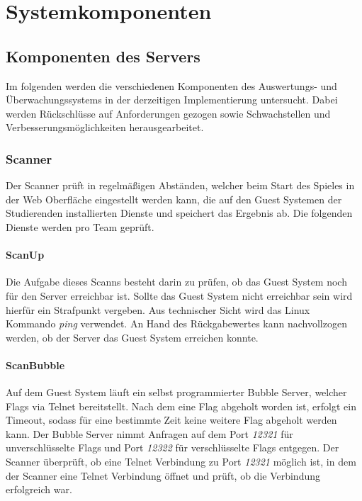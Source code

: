 \section{Systemkomponenten}\label{sec:Systemkomponenten}

\subsection{Komponenten des Servers}\label{subsec:Komponente_des_Servers}
Im folgenden werden die verschiedenen Komponenten des Auswertungs- und Überwachungssystems in der derzeitigen Implementierung untersucht. Dabei werden Rückschlüsse auf Anforderungen gezogen sowie Schwachstellen und Verbesserungsmöglichkeiten herausgearbeitet.

\subsubsection{Scanner}\label{subsubsec:Scanner}
Der Scanner prüft in regelmäßigen Abständen, welcher beim Start des Spieles in der Web Oberfläche eingestellt werden kann, die auf den Guest Systemen der Studierenden installierten Dienste und speichert das Ergebnis ab. Die folgenden Dienste werden pro Team geprüft.

\paragraph{ScanUp}\label{para:ScanUp}
Die Aufgabe dieses Scanns besteht darin zu prüfen, ob das Guest System noch für den Server erreichbar ist. Sollte das Guest System nicht erreichbar sein wird hierfür ein Strafpunkt vergeben. Aus technischer Sicht wird das Linux Kommando \textit{ping} verwendet. An Hand des Rückgabewertes kann nachvollzogen werden, ob der Server das Guest System erreichen konnte.

\paragraph{ScanBubble}\label{para:ScanBubble}
Auf dem Guest System läuft ein selbst programmierter Bubble Server, welcher Flags via Telnet bereitstellt. Nach dem eine Flag abgeholt worden ist, erfolgt ein Timeout, sodass für eine bestimmte Zeit keine weitere Flag abgeholt werden kann. Der Bubble Server nimmt Anfragen auf dem Port \textit{12321} für unverschlüsselte Flags und Port \textit{12322} für verschlüsselte Flags entgegen.
Der Scanner überprüft, ob eine Telnet Verbindung zu Port \textit{12321} möglich ist, in dem der Scanner eine Telnet Verbindung öffnet und prüft, ob die Verbindung erfolgreich war.

